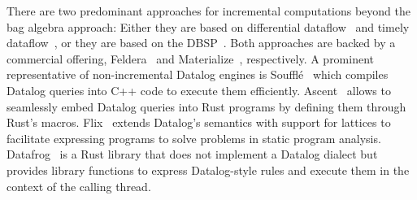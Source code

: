 There are two predominant approaches for incremental computations beyond
the bag algebra approach:
Either they are based on differential dataflow~\cite{mcsherry2013differential}
and timely dataflow~\cite{timelydataflow}, or they are based on
the DBSP~\cite{budiu2024dbsp, budiu2025dbsp}.
Both approaches are backed by a commercial offering,
Feldera~\cite{felderainc} and Materialize~\cite{materializeinc}, respectively.
A prominent representative of non-incremental Datalog engines is
Soufflé~\cite{souffle} which compiles Datalog queries into C++ code to execute
them efficiently.
Ascent~\cite{ascent} allows to seamlessly embed Datalog queries into Rust
programs by defining them through Rust's macros.
Flix~\cite{flix} extends Datalog's semantics with support for lattices to
facilitate expressing programs to solve problems in static program analysis.
Datafrog~\cite{datafrog} is a Rust library that does not implement a Datalog
dialect but provides library functions to express Datalog-style rules and
execute them in the context of the calling thread.
